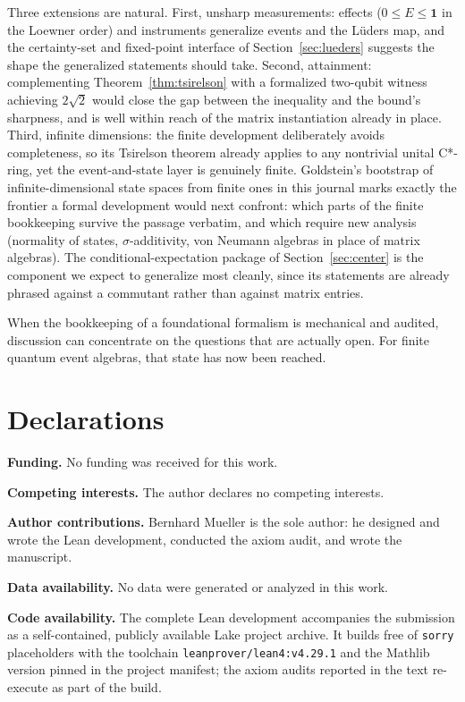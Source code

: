 \documentclass[11pt]{article}
\renewcommand{\_}{\textunderscore\allowbreak}
\theoremstyle{remark}
\newcommand{\one}{\mathbf 1}
\begin{document}
Three extensions are natural. First, unsharp measurements: effects ($0 \le E \le \one$ in the Loewner order) and instruments generalize events and the L\"uders map, and the certainty-set and fixed-point interface of Section~\ref{sec:lueders} suggests the shape the generalized statements should take. Second, attainment: complementing Theorem~\ref{thm:tsirelson} with a formalized two-qubit witness achieving $2\sqrt 2$ would close the gap between the inequality and the bound's sharpness, and is well within reach of the matrix instantiation already in place. Third, infinite dimensions: the finite development deliberately avoids completeness, so its Tsirelson theorem already applies to any nontrivial unital C*-ring, yet the event-and-state layer is genuinely finite. Goldstein's bootstrap of infinite-dimensional state spaces from finite ones in this journal \cite{goldstein2026} marks exactly the frontier a formal development would next confront: which parts of the finite bookkeeping survive the passage verbatim, and which require new analysis (normality of states, $\sigma$-additivity, von Neumann algebras in place of matrix algebras). The conditional-expectation package of Section~\ref{sec:center} is the component we expect to generalize most cleanly, since its statements are already phrased against a commutant rather than against matrix entries.

When the bookkeeping of a foundational formalism is mechanical and audited, discussion can concentrate on the questions that are actually open. For finite quantum event algebras, that state has now been reached.

\section*{Declarations}

\textbf{Funding.} No funding was received for this work.

\textbf{Competing interests.} The author declares no competing interests.

\textbf{Author contributions.} Bernhard Mueller is the sole author: he designed and wrote the Lean development, conducted the axiom audit, and wrote the manuscript.

\textbf{Data availability.} No data were generated or analyzed in this work.

\textbf{Code availability.} The complete Lean development \cite{eventalgebra} accompanies the submission as a self-contained, publicly available Lake project archive. It builds free of \texttt{sorry} placeholders with the toolchain \texttt{leanprover/lean4:v4.29.1} and the Mathlib version pinned in the project manifest; the axiom audits reported in the text re-execute as part of the build.



\end{document}
